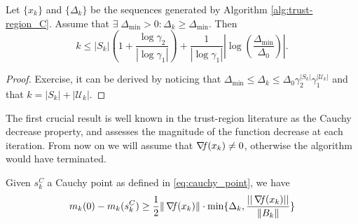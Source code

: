 \documentclass[10pt,a4paper]{article}
\begin{document}
\begin{lemma}
	Let $\{x_k\}$ and $\{\Delta_k\}$ be the sequences generated by Algorithm \ref{alg:trust-region_C}. Assume that $\exists \; \Delta_{\min} > 0: \Delta_k \geq \Delta_{\min}$. Then
	\begin{equation*}
		k \leq |S_k| \left( 1 + \frac{\log \gamma_2}{|\log \gamma_1|} \right) + \frac{1}{|\log \gamma_1|} \left| \log \left( \frac{\Delta_{\min}}{\Delta_0} \right) \right|.
	\end{equation*}
\end{lemma}

\begin{proof}
	Exercise, it can be derived by noticing that $\Delta_{\min} \leq \Delta_k \leq \Delta_0 \gamma_2^{|S_k|} \gamma_1^{|\mathcal{U}_k|}$ and that $k= |S_k| + |\mathcal{U}_k|$.
\end{proof}
\noindent The first crucial result is well known in the trust-region literature as the Cauchy
decrease property, and assesses the magnitude of the function decrease at each iteration. From now on we will assume that $\operatorname*{\mathit{\nabla \!f}}(x_k)\neq 0$, otherwise the algorithm would have terminated.  
\begin{lemma}\label{lemma:cauchy}
	Given $s_k^C$ a Cauchy point as defined in \eqref{eq:cauchy_point}, we have
	\begin{equation}\label{eq:model_decrease}
		m_k(0)-m_k(s_k^C) \geq \frac{1}{2}\|\operatorname*{\mathit{\nabla \!f}}(x_k)\|\cdot \min\{\Delta_k, \frac{||\operatorname*{\mathit{\nabla \!f}}(x_k)||}{\|B_k\|} \}
	\end{equation}
\end{lemma}
\end{document}
